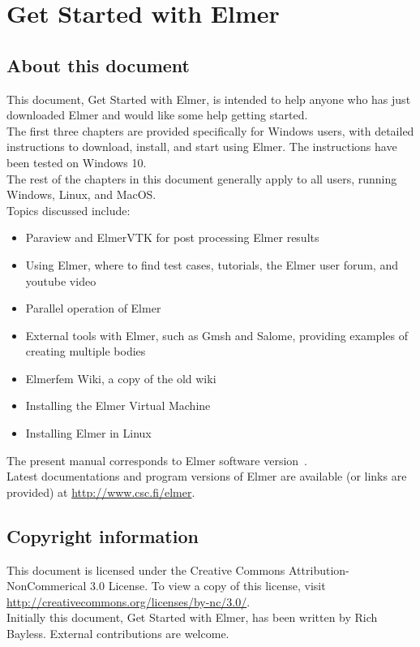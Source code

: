 \chapter*{Get Started with Elmer}

\section*{About this document}

This document, Get Started with Elmer, is intended to help anyone who has just downloaded Elmer and would like some help getting started.\\

The first three chapters are provided specifically for Windows users, with detailed instructions to download, install, and start using Elmer.  The instructions have been tested on Windows 10.\\

The rest of the chapters in this document generally apply to all users, running Windows, Linux, and MacOS.\\

Topics discussed include:

\begin{itemize}
  \item Paraview and ElmerVTK for post processing Elmer results
  \item Using Elmer, where to find test cases, tutorials, the Elmer user forum, and youtube video
  \item Parallel operation of Elmer
  \item External tools with Elmer, such as Gmsh and Salome, providing examples of creating multiple bodies
  \item Elmerfem Wiki, a copy of the old wiki
  \item Installing the Elmer Virtual Machine
  \item Installing Elmer in Linux
\end{itemize}


The present manual corresponds to Elmer software version~\elmerversion{}.\\

Latest documentations and program versions of Elmer are available (or links are provided) at \url{http://www.csc.fi/elmer}. \\

\section*{Copyright information}

This document is licensed under the Creative Commons Attribution-NonCommerical 3.0 License.  To view a copy of this license, visit \url{http://creativecommons.org/licenses/by-nc/3.0/}.\\

Initially this document, Get Started with Elmer, has been written by Rich Bayless.  External contributions are welcome.



